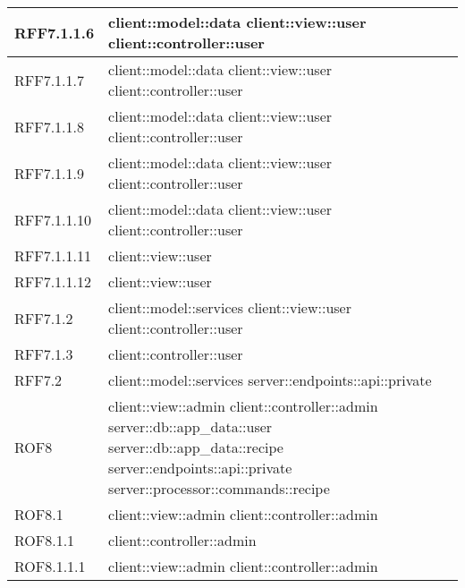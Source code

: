 \begin{center}
\begin{longtable}{| p{4cm} | p{8cm} |}
\hline
RFF7.1.1.6 & client::model::data \newline client::view::user \newline client::controller::user \\
\hline
RFF7.1.1.7 & client::model::data \newline client::view::user \newline client::controller::user \\
\hline
RFF7.1.1.8 & client::model::data \newline client::view::user \newline client::controller::user \\
\hline
RFF7.1.1.9 & client::model::data \newline client::view::user \newline client::controller::user \\
\hline
RFF7.1.1.10 & client::model::data \newline client::view::user \newline client::controller::user \\
\hline
RFF7.1.1.11 & client::view::user \\
\hline
RFF7.1.1.12 & client::view::user \\
\hline
RFF7.1.2 & client::model::services \newline client::view::user \newline client::controller::user \\
\hline
RFF7.1.3 & client::controller::user \\
\hline
RFF7.2 & client::model::services \newline server::endpoints::api::private \\
\hline
ROF8 & client::view::admin \newline client::controller::admin \newline server::db::app\_data::user \newline server::db::app\_data::recipe \newline server::endpoints::api::private \newline server::processor::commands::recipe \\
\hline
ROF8.1 & client::view::admin \newline client::controller::admin \\
\hline
ROF8.1.1 & client::controller::admin \\
\hline
ROF8.1.1.1 & client::view::admin \newline client::controller::admin \\

\end{longtable}
\end{center}
